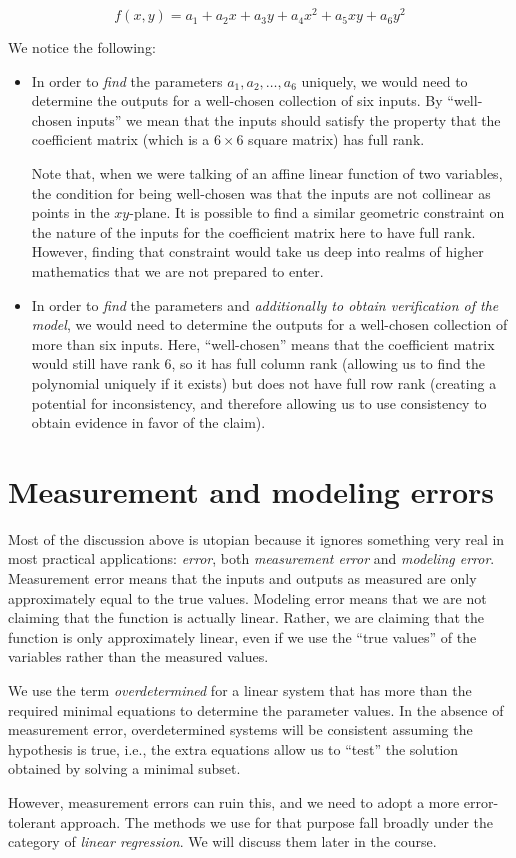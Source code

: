 \documentclass[10pt]{amsart}
\begin{document}
$$f(x,y) = a_1 + a_2x + a_3y + a_4x^2 + a_5xy + a_6y^2$$

We notice the following:

\begin{itemize}
\item In order to {\em find} the parameters $a_1,a_2,\dots,a_6$
  uniquely, we would need to determine the outputs for a well-chosen
  collection of six inputs. By ``well-chosen inputs'' we mean that the
  inputs should satisfy the property that the coefficient matrix
  (which is a $6 \times 6$ square matrix) has full rank.

  Note that, when we were talking of an affine linear function of two
  variables, the condition for being well-chosen was that the inputs
  are not collinear as points in the $xy$-plane. It is possible to
  find a similar geometric constraint on the nature of the inputs for
  the coefficient matrix here to have full rank. However, finding that
  constraint would take us deep into realms of higher mathematics that
  we are not prepared to enter.
\item In order to {\em find} the parameters and {\em additionally to
  obtain verification of the model}, we would need to determine the
  outputs for a well-chosen collection of more than six inputs. Here,
  ``well-chosen'' means that the coefficient matrix would still have
  rank $6$, so it has full column rank (allowing us to find the
  polynomial uniquely if it exists) but does not have full row rank
  (creating a potential for inconsistency, and therefore allowing us
  to use consistency to obtain evidence in favor of the claim).
\end{itemize}
\section{Measurement and modeling errors}

Most of the discussion above is utopian because it ignores something
very real in most practical applications: {\em error}, both {\em
  measurement error} and {\em modeling error}. Measurement error means
that the inputs and outputs as measured are only approximately equal
to the true values. Modeling error means that we are not claiming that
the function is actually linear. Rather, we are claiming that the
function is only approximately linear, even if we use the ``true
values'' of the variables rather than the measured values.

We use the term {\em overdetermined} for a linear system that has more
than the required minimal equations to determine the parameter
values. In the absence of measurement error, overdetermined systems
will be consistent assuming the hypothesis is true, i.e., the extra
equations allow us to ``test'' the solution obtained by solving a
minimal subset.

However, measurement errors can ruin this, and we need to adopt a more
error-tolerant approach. The methods we use for that purpose fall
broadly under the category of {\em linear regression}. We will discuss
them later in the course.
\end{document}
